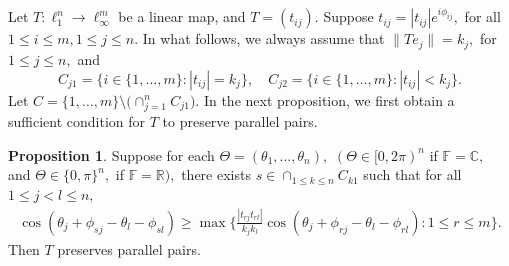 \documentclass{amsart}
\theoremstyle{definition}
\newtheorem{prop}[theorem]{Proposition}
\theoremstyle{remark}
\numberwithin{equation}{section}
\begin{document}
	Let $T:\ell_1^n\to \ell_\infty^m$ be a linear map, and $T=(t_{ij}).$ 	Suppose $ t_{ij}=|t_{ij}|e^{i\phi_{ij}},$ for all $1\leq i\leq m, 1\leq j\leq n.$  In what follows, we  always assume that $\|Te_j\|=k_j,$ for $1\leq j\leq n,$ and  $$C_{j1}=\{i\in\{1,\ldots,m\}:|t_{ij}|=k_j\},\quad C_{j2}=\{i\in\{1,\ldots,m\}:|t_{ij}|<k_j\}.$$
	Let $C=\{1,\ldots,m\}\setminus \Big(\cap_{j=1}^n C_{j1}\Big).$
 In the next proposition,  we first obtain a sufficient condition for  $T$ to preserve parallel pairs.
\begin{prop}\label{prop-nsuff}
Suppose for each $\Theta=(\theta_1,\ldots,\theta_n),$ $(\Theta\in [0,2\pi)^n$ if $\mathbb{F}=\mathbb{C},$ and $ \Theta\in \{0,\pi\}^n,$ if $\mathbb{F}=\mathbb{R}),$ there exists $s\in \cap _{1\leq k\leq n}C_{k1}$ such that for all $1\leq j<l\leq n,$ 
\begin{eqnarray*}
	\cos(\theta_j+\phi_{sj}-\theta_l-\phi_{sl})
\geq \max\Big\{\frac{|t_{rj}t_{rl}|}{k_jk_l}\cos(\theta_j+\phi_{rj}-\theta_l-\phi_{rl}):1\leq r\leq m\Big\}.
 \end{eqnarray*}
	Then $T$ preserves parallel pairs.
\end{prop}
\end{document}
